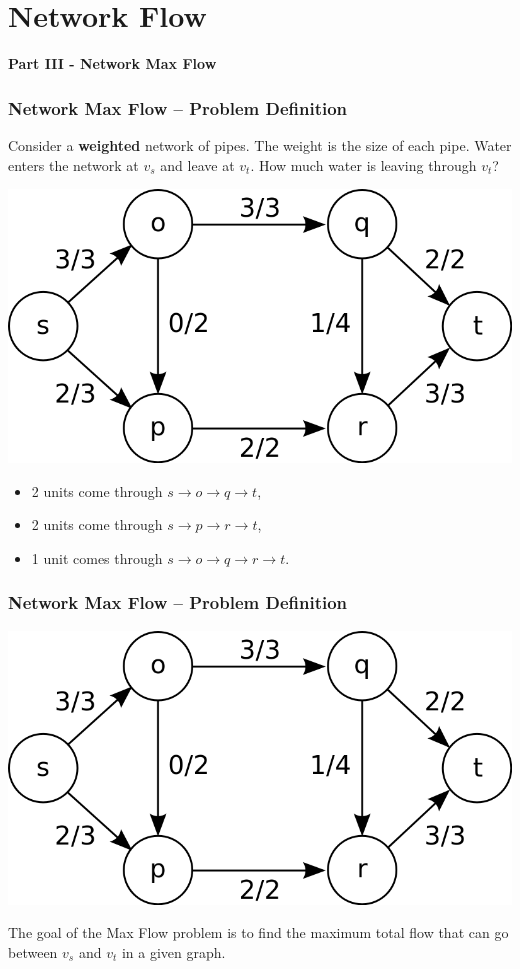 \section{Network Flow}

\begin{frame}
  \begin{center}
    {\bf Part III - Network Max Flow}
  \end{center}
\end{frame}

\begin{frame}
  \frametitle{Network Max Flow -- Problem Definition}

  \begin{block}{}
    Consider a {\bf weighted} network of pipes. The weight is the size of each pipe. Water enters the network at $v_s$ and leave at $v_t$. How much water is leaving through $v_t$?
  \end{block}

  \begin{center}
    \includegraphics[width=.45\textwidth]{../img/maxflow_wiki}
  \end{center}

  \begin{itemize}
    \item 2 units come through $s\to o \to q \to t$,
    \item 2 units come through $s\to p\to r\to t$,
    \item 1 unit comes through $s\to o\to q\to r\to t$.
  \end{itemize}
\end{frame}

\begin{frame}
  \frametitle{Network Max Flow -- Problem Definition}
  \begin{center}
    \includegraphics[width=.55\textwidth]{../img/maxflow_wiki}
  \end{center}
  \bigskip

  The goal of the Max Flow problem is to find the maximum total flow that can go between $v_s$ and $v_t$ in a given graph.
\end{frame}


